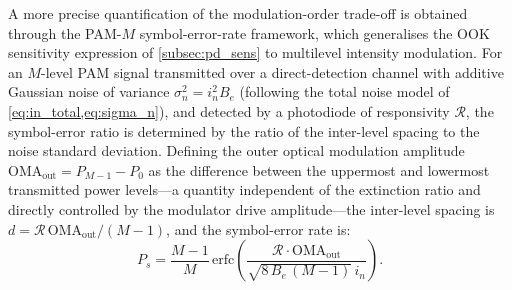 A more precise quantification of the modulation-order trade-off is obtained through the PAM-$M$ symbol-error-rate framework, which generalises the OOK sensitivity expression of \cref{subsec:pd_sens} to multilevel intensity modulation. For an $M$-level PAM signal transmitted over a direct-detection channel with additive Gaussian noise of variance $\sigma_n^2 = i_n^2 B_e$ (following the total noise model of \cref{eq:in_total,eq:sigma_n}), and detected by a photodiode of responsivity $\mathcal{R}$, the symbol-error ratio is determined by the ratio of the inter-level spacing to the noise standard deviation. Defining the outer optical modulation amplitude $\mathrm{OMA}_\mathrm{out} = P_{M-1} - P_0$ as the difference between the uppermost and lowermost transmitted power levels—a quantity independent of the extinction ratio and directly controlled by the modulator drive amplitude—the inter-level spacing is $d = \mathcal{R}\,\mathrm{OMA}_\mathrm{out}/(M-1)$, and the symbol-error rate is:
\begin{equation}
    P_s = \frac{M-1}{M}
    \,\mathrm{erfc}\!\left(
    \frac{\mathcal{R}\cdot\mathrm{OMA}_\mathrm{out}}
         {\sqrt{8\,B_e\,(M-1)}\,i_n}
    \right).
    \label{eq:ser_pam}
\end{equation}
